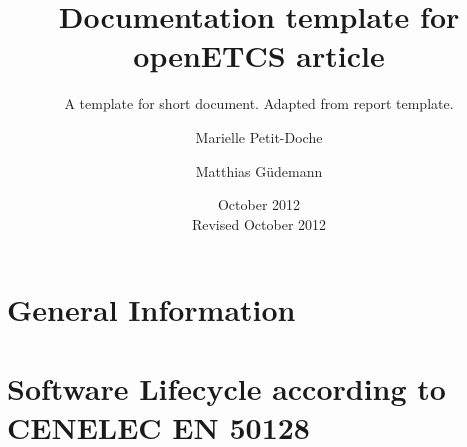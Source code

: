 \documentclass{template/openetcs_article}
\begin{document}
\frontmatter
{}




\title{Documentation template for openETCS article}

\subtitle{A template for short document. Adapted from report template.}

\date{October 2012\\Revised October 2012}


\author{Marielle Petit-Doche}

\author{Matthias Güdemann}






\begin{abstract}

\end{abstract}

\maketitle
\tableofcontents
\listoffiguresandtables
\newpage













\section{General Information}
\label{sec:general-information}


\section{Software Lifecycle according to CENELEC EN 50128}
\label{sec:sofware-lifecycle}


%

\end{document}
